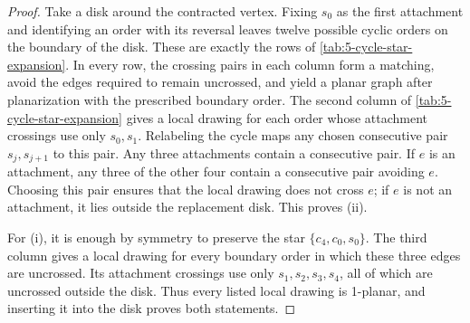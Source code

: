 \documentclass[a4paper,11pt]{article}
\theoremstyle{plain}
\theoremstyle{definition}  %
\begin{document}
\begin{proof}
    Take a disk around the contracted vertex.  Fixing $s_0$ as the first
    attachment and identifying an order with its reversal leaves twelve
    possible cyclic orders on the boundary of the disk.  These are exactly
    the rows of \cref{tab:5-cycle-star-expansion}.  In every row, the crossing
    pairs in each column form a matching, avoid the edges required to remain
    uncrossed, and yield a planar graph after planarization with the prescribed
    boundary order.  The second column
    of \cref{tab:5-cycle-star-expansion} gives a local drawing for each order
    whose attachment crossings use only $s_0,s_1$.  Relabeling the cycle maps
    any chosen consecutive pair $s_j,s_{j+1}$ to this pair.  Any three
    attachments contain a consecutive pair.  If $e$ is an attachment, any
    three of the other four contain a consecutive pair avoiding $e$.
    Choosing this pair ensures that the local drawing does not cross $e$;
    if $e$ is not an attachment, it lies outside the replacement disk.
    This proves (ii).

    For (i), it is enough by symmetry to preserve the star
    $\{c_4,c_0,s_0\}$.  The third column gives a local drawing for every
    boundary order in which these three edges are uncrossed.  Its attachment
    crossings use only $s_1,s_2,s_3,s_4$, all of which are uncrossed outside
    the disk.  Thus every listed local drawing is 1-planar, and inserting it
    into the disk proves both statements.
\end{proof}
\end{document}
